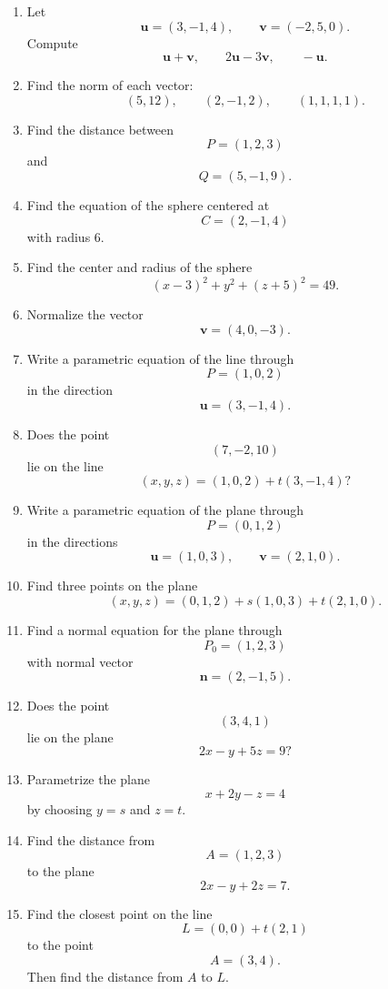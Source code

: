 \begin{enumerate}
    \item Let
    \[
        \mathbf u=(3,-1,4),\qquad \mathbf v=(-2,5,0).
    \]
    Compute
    \[
        \mathbf u+\mathbf v,\qquad
        2\mathbf u-3\mathbf v,\qquad
        -\mathbf u.
    \]

    \item Find the norm of each vector:
    \[
        (5,12),\qquad
        (2,-1,2),\qquad
        (1,1,1,1).
    \]

    \item Find the distance between
    \[
        P=(1,2,3)
    \]
    and
    \[
        Q=(5,-1,9).
    \]

    \item Find the equation of the sphere centered at
    \[
        C=(2,-1,4)
    \]
    with radius \(6\).

    \item Find the center and radius of the sphere
    \[
        (x-3)^2+y^2+(z+5)^2=49.
    \]

    \item Normalize the vector
    \[
        \mathbf v=(4,0,-3).
    \]

    \item Write a parametric equation of the line through
    \[
        P=(1,0,2)
    \]
    in the direction
    \[
        \mathbf u=(3,-1,4).
    \]

    \item Does the point
    \[
        (7,-2,10)
    \]
    lie on the line
    \[
        (x,y,z)=(1,0,2)+t(3,-1,4)?
    \]

    \item Write a parametric equation of the plane through
    \[
        P=(0,1,2)
    \]
    in the directions
    \[
        \mathbf u=(1,0,3),\qquad
        \mathbf v=(2,1,0).
    \]

    \item Find three points on the plane
    \[
        (x,y,z)=(0,1,2)+s(1,0,3)+t(2,1,0).
    \]

    \item Find a normal equation for the plane through
    \[
        P_0=(1,2,3)
    \]
    with normal vector
    \[
        \mathbf n=(2,-1,5).
    \]

    \item Does the point
    \[
        (3,4,1)
    \]
    lie on the plane
    \[
        2x-y+5z=9?
    \]

    \item Parametrize the plane
    \[
        x+2y-z=4
    \]
    by choosing \(y=s\) and \(z=t\).

    \item Find the distance from
    \[
        A=(1,2,3)
    \]
    to the plane
    \[
        2x-y+2z=7.
    \]

    \item Find the closest point on the line
    \[
        L=(0,0)+t(2,1)
    \]
    to the point
    \[
        A=(3,4).
    \]
    Then find the distance from \(A\) to \(L\).
\end{enumerate}

